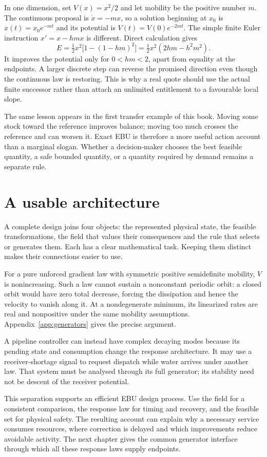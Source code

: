 In one dimension, set $V(x)=x^2/2$ and let mobility be the positive number $m$. The continuous proposal is $\dot x=-mx$, so a solution beginning at $x_0$ is $x(t)=x_0e^{-mt}$ and its potential is $V(t)=V(0)e^{-2mt}$. The simple finite Euler instruction $x'=x-hmx$ is different. Direct calculation gives
\begin{equation}
 E=\tfrac12x^2\bigl[1-(1-hm)^2\bigr]
  =\tfrac12x^2(2hm-h^2m^2).
\end{equation}
It improves the potential only for $0<hm<2$, apart from equality at the endpoints. A larger discrete step can reverse the promised direction even though the continuous law is restoring. This is why a real quote should use the actual finite successor rather than attach an unlimited entitlement to a favourable local slope.

The same lesson appears in the first transfer example of this book. Moving some stock toward the reference improves balance; moving too much crosses the reference and can worsen it. Exact EBU is therefore a more useful action account than a marginal slogan. Whether a decision-maker chooses the best feasible quantity, a safe bounded quantity, or a quantity required by demand remains a separate rule.

\section{A usable architecture}
A complete design joins four objects: the represented physical state, the feasible transformations, the field that values their consequences and the rule that selects or generates them. Each has a clear mathematical task. Keeping them distinct makes their connections easier to use.

For a pure unforced gradient law with symmetric positive semidefinite mobility, $V$ is nonincreasing. Such a law cannot sustain a nonconstant periodic orbit: a closed orbit would have zero total decrease, forcing the dissipation and hence the velocity to vanish along it. At a nondegenerate minimum, its linearized rates are real and nonpositive under the same mobility assumptions. Appendix~\ref{app:generators} gives the precise argument.

A pipeline controller can instead have complex decaying modes because its pending state and consumption change the response architecture. It may use a receiver-shortage signal to request dispatch while water arrives under another law. That system must be analysed through its full generator; its stability need not be descent of the receiver potential.

This separation supports an efficient EBU design process. Use the field for a consistent comparison, the response law for timing and recovery, and the feasible set for physical safety. The resulting account can explain why a necessary service consumes resources, where correction is delayed and which improvements reduce avoidable activity. The next chapter gives the common generator interface through which all these response laws supply endpoints.
